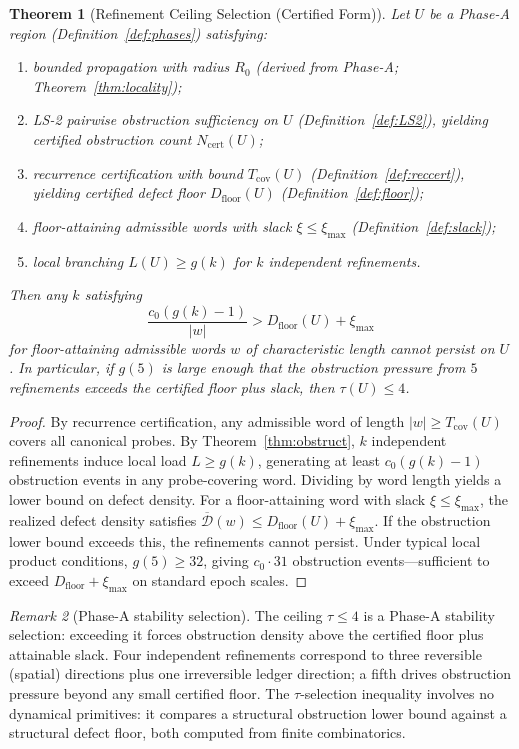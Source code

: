 \documentclass[11pt,a4paper]{article}
\newtheorem{theorem}{Theorem}[section]
\theoremstyle{definition}
\theoremstyle{remark}
\newtheorem{remark}[theorem]{Remark}
\begin{document}
\begin{theorem}[Refinement Ceiling Selection (Certified Form)]\label{thm:ceiling}
Let $U$ be a Phase-A region (Definition~\ref{def:phases}) satisfying:
\begin{enumerate}[label=(\roman*)]
  \item bounded propagation with radius $R_0$ (derived from Phase-A; Theorem~\ref{thm:locality});
  \item LS-2 pairwise obstruction sufficiency on $U$ (Definition~\ref{def:LS2}), yielding certified obstruction count $N_{\mathrm{cert}}(U)$;
  \item recurrence certification with bound $T_{\mathrm{cov}}(U)$ (Definition~\ref{def:reccert}), yielding certified defect floor $D_{\mathrm{floor}}(U)$ (Definition~\ref{def:floor});
  \item floor-attaining admissible words with slack $\xi \leq \xi_{\max}$ (Definition~\ref{def:slack});
  \item local branching $L(U) \geq g(k)$ for $k$ independent refinements.
\end{enumerate}
Then any $k$ satisfying
\[
  \frac{c_0(g(k) - 1)}{|w|} > D_{\mathrm{floor}}(U) + \xi_{\max}
\]
for floor-attaining admissible words $w$ of characteristic length cannot persist on $U$. In particular, if $g(5)$ is large enough that the obstruction pressure from $5$ refinements exceeds the certified floor plus slack, then $\tau(U) \leq 4$.
\end{theorem}
\begin{proof}
By recurrence certification, any admissible word of length $|w| \geq T_{\mathrm{cov}}(U)$ covers all canonical probes. By Theorem~\ref{thm:obstruct}, $k$ independent refinements induce local load $L \geq g(k)$, generating at least $c_0(g(k)-1)$ obstruction events in any probe-covering word. Dividing by word length yields a lower bound on defect density. For a floor-attaining word with slack $\xi \leq \xi_{\max}$, the realized defect density satisfies $\overline{\mathcal{D}}(w) \leq D_{\mathrm{floor}}(U) + \xi_{\max}$. If the obstruction lower bound exceeds this, the refinements cannot persist. Under typical local product conditions, $g(5) \geq 32$, giving $c_0 \cdot 31$ obstruction events---sufficient to exceed $D_{\mathrm{floor}} + \xi_{\max}$ on standard epoch scales.
\end{proof}

\begin{remark}[Phase-A stability selection]\label{rem:selection}
The ceiling $\tau \leq 4$ is a Phase-A stability selection: exceeding it forces obstruction density above the certified floor plus attainable slack. Four independent refinements correspond to three reversible (spatial) directions plus one irreversible ledger direction; a fifth drives obstruction pressure beyond any small certified floor. The $\tau$-selection inequality involves no dynamical primitives: it compares a structural obstruction lower bound against a structural defect floor, both computed from finite combinatorics.
\end{remark}
\end{document}
